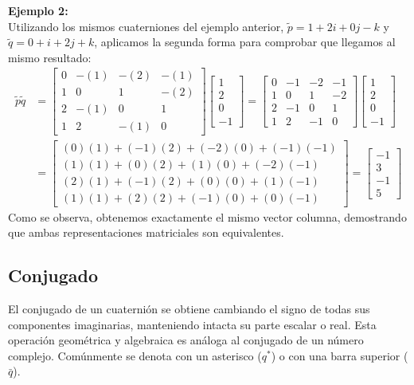 \textbf{Ejemplo 2:} \\
Utilizando los mismos cuaterniones del ejemplo anterior, $\tilde{p} = 1 + 2i + 0j - k$ y $\tilde{q} = 0 + i + 2j + k$, aplicamos la segunda forma para comprobar que llegamos al mismo resultado:
\begin{align*}
    \tilde{p}\tilde{q} &= 
    \begin{bmatrix}
        0 & -(1) & -(2) & -(1) \\
        1 &  0 &  1 & -(2) \\
        2 & -(1) &  0 &  1 \\
        1 &  2 & -(1) &  0
    \end{bmatrix}
    \begin{bmatrix}
        1 \\ 2 \\ 0 \\ -1
    \end{bmatrix}
    =
    \begin{bmatrix}
        0 & -1 & -2 & -1 \\
        1 & 0 & 1 & -2 \\
        2 & -1 & 0 & 1 \\
        1 & 2 & -1 & 0
    \end{bmatrix}
    \begin{bmatrix}
        1 \\ 2 \\ 0 \\ -1
    \end{bmatrix} \\
    &=
    \begin{bmatrix}
        (0)(1) + (-1)(2) + (-2)(0) + (-1)(-1) \\
        (1)(1) + (0)(2) + (1)(0) + (-2)(-1) \\
        (2)(1) + (-1)(2) + (0)(0) + (1)(-1) \\
        (1)(1) + (2)(2) + (-1)(0) + (0)(-1)
    \end{bmatrix}
    =
    \begin{bmatrix}
        -1 \\ 3 \\ -1 \\ 5
    \end{bmatrix}
\end{align*}
Como se observa, obtenemos exactamente el mismo vector columna, demostrando que ambas representaciones matriciales son equivalentes.


\subsection{Conjugado}
El conjugado de un cuaternión se obtiene cambiando el signo de todas sus componentes imaginarias, manteniendo intacta su parte escalar o real. Esta operación geométrica y algebraica es análoga al conjugado de un número complejo. Comúnmente se denota con un asterisco ($q^*$) o con una barra superior ($\bar{q}$).


